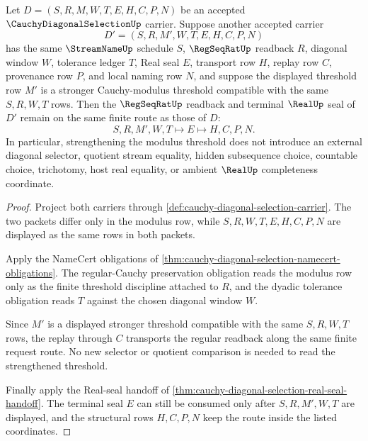 \begin{theorem}
\label{thm:cauchy-diagonal-selection-regseqrat-threshold-stability}
Let $D=(S,R,M,W,T,E,H,C,P,N)$ be an accepted $\CauchyDiagonalSelectionUp$ carrier. Suppose another accepted carrier
$$
D'=(S,R,M',W,T,E,H,C,P,N)
$$
has the same $\StreamNameUp$ schedule $S$, $\RegSeqRatUp$ readback $R$, diagonal window $W$, tolerance ledger $T$, Real seal $E$, transport row $H$, replay row $C$, provenance row $P$, and local naming row $N$, and suppose the displayed threshold row $M'$ is a stronger Cauchy-modulus threshold compatible with the same $S,R,W,T$ rows. Then the $\RegSeqRatUp$ readback and terminal $\RealUp$ seal of $D'$ remain on the same finite route as those of $D$:
$$
S,R,M',W,T \longmapsto E \longmapsto H,C,P,N .
$$
In particular, strengthening the modulus threshold does not introduce an external diagonal selector, quotient stream equality, hidden subsequence choice, countable choice, trichotomy, host real equality, or ambient $\RealUp$ completeness coordinate.
\end{theorem}
\begin{proof}
Project both carriers through \autoref{def:cauchy-diagonal-selection-carrier}. The two packets differ only in the modulus row, while $S,R,W,T,E,H,C,P,N$ are displayed as the same rows in both packets.

Apply the NameCert obligations of \autoref{thm:cauchy-diagonal-selection-namecert-obligations}. The regular-Cauchy preservation obligation reads the modulus row only as the finite threshold discipline attached to $R$, and the dyadic tolerance obligation reads $T$ against the chosen diagonal window $W$.

Since $M'$ is a displayed stronger threshold compatible with the same $S,R,W,T$ rows, the replay through $C$ transports the regular readback along the same finite request route. No new selector or quotient comparison is needed to read the strengthened threshold.

Finally apply the Real-seal handoff of \autoref{thm:cauchy-diagonal-selection-real-seal-handoff}. The terminal seal $E$ can still be consumed only after $S,R,M',W,T$ are displayed, and the structural rows $H,C,P,N$ keep the route inside the listed coordinates.
\end{proof}

